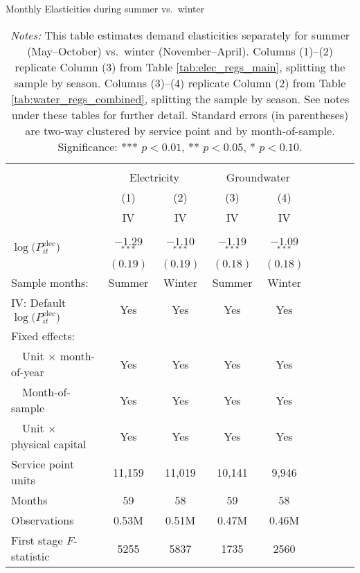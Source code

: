 \begin{table}[t!]\centering
\small
\caption{Monthly Elasticities during summer vs.\ winter  \label{tab:elec_water_regs_summer_winter}}
\vspace{-0.1cm}
\small
\begin{adjustbox}{center} 
\begin{tabular}{lcccccccc} 
\hline \hline
\vspace{-0.37cm}
\\
 & \multicolumn{2}{c}{Electricity} & \multicolumn{2}{c}{Groundwater} \\
 \cmidrule(r){2-3} \cmidrule(l){4-5}
 & (1)  & (2)  & (3)  & (4)     \\ 
[0.1em]
 & IV & IV & IV & IV  \\
\vspace{-0.37cm}
\\
\cline{2-5}
\vspace{-0.27cm}
\\
 $\log\big(P^{\text{elec}}_{it}\big)$ ~ & $-1.29$$^{***}$  & $-1.10$$^{***}$ & $-1.19$$^{***}$ & $-1.09$$^{***}$ \\ 
& $(0.19)$ & $(0.19)$ & $(0.18)$ & $(0.18)$  \\
[1.5em] 
Sample months: & Summer & Winter & Summer & Winter \\
[1em] 
IV: Default $\log\big(P^{\text{elec}}_{it}\big)$  & Yes & Yes &  Yes  &  Yes \\
[1em] 
Fixed effects: \\
[0.1em] 
~~Unit $\times$ month-of-year  & Yes  & Yes   & Yes  & Yes   \\ 
[0.1em] 
~~Month-of-sample  & Yes  & Yes   & Yes  & Yes     \\ 
[0.1em] 
~~Unit $\times$ physical capital & Yes & Yes & Yes & Yes  \\
[1em] 
Service point units & 11,159 & 11,019 & 10,141 & 9,946   \\ 
[0.1em] 
Months  & 59 & 58 & 59 & 58   \\ 
[0.1em] 
Observations & 0.53M & 0.51M & 0.47M & 0.46M \\ 
[0.1em] 
First stage $F$-statistic & 5255 & 5837 & 1735 & 2560   \\ 
[0.15em]
\hline
\end{tabular}
\end{adjustbox}
\captionsetup{width=\textwidth}
\caption*{\scriptsize \emph{Notes:} This table estimates demand elasticities separately for summer (May--October) vs.\ winter (November--April). 
Columns (1)--(2) replicate Column (3) from Table \ref{tab:elec_regs_main}, splitting the sample by season. 
Columns (3)--(4) replicate Column (2) from Table \ref{tab:water_regs_combined}, splitting the sample by season. 
See notes under these tables for further detail. 
Standard errors (in parentheses) are two-way clustered by service point and by month-of-sample.
Significance: *** $p < 0.01$, ** $p < 0.05$, * $p < 0.10$.
}
\end{table}
